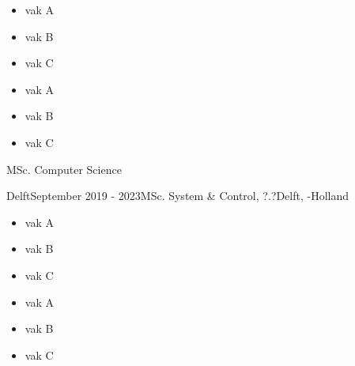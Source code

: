 \begin{rSection}{}
  \vspace{-0.2cm}
  \begin{minipage}{0.4\textwidth}
  \begin{itemize}
    \item vak A\\[-3ex]
    \item vak B\\[-3ex]
    \item vak C\\[-3ex]
  \end{itemize}
  \end{minipage}
  \begin{minipage}{0.4\textwidth}
  \begin{itemize}
    \item vak A\\[-3ex]
    \item vak B\\[-3ex]
    \item vak C\\[-3ex]
  \end{itemize}
  \end{minipage}

  \begin{experienceItem}
    {}{}{ MSc. Computer Science}{}
  \end{experienceItem}

  \begin{experienceItem}
    { Delft}{September 2019 -  2023}{MSc. System \& Control,  ?.?}{Delft, -Holland}
  \end{experienceItem}
  \begin{experienceItem}
    {}{}{}{}
  \end{experienceItem}

  \vspace{-0.2cm}
  \begin{minipage}{0.4\textwidth}
  \begin{itemize}
    \item vak A\\[-3ex]
    \item vak B\\[-3ex]
    \item vak C\\[-3ex]
  \end{itemize}
  \end{minipage}
  \begin{minipage}{0.4\textwidth}
  \begin{itemize}
    \item vak A\\[-3ex]
    \item vak B\\[-3ex]
    \item vak C\\[-3ex]
  \end{itemize}
  \end{minipage}


\end{rSection}
